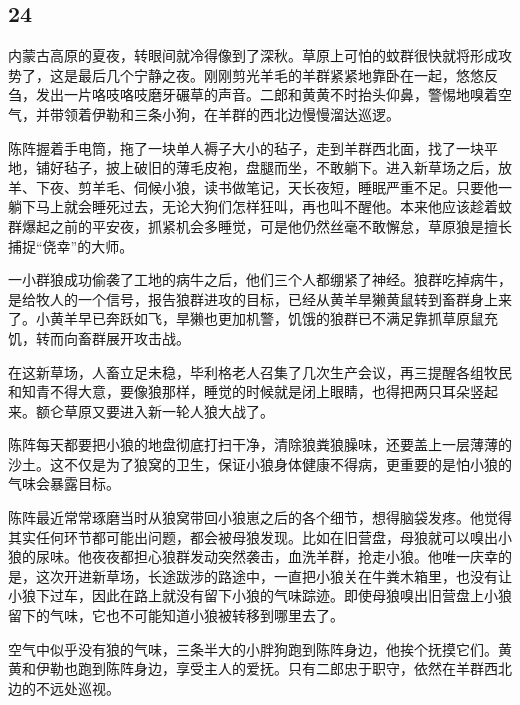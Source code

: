 \subsection*{24}



\par 内蒙古高原的夏夜，转眼间就冷得像到了深秋。草原上可怕的蚊群很快就将形成攻势了，这是最后几个宁静之夜。刚刚剪光羊毛的羊群紧紧地靠卧在一起，悠悠反刍，发出一片咯吱咯吱磨牙碾草的声音。二郎和黄黄不时抬头仰鼻，警惕地嗅着空气，并带领着伊勒和三条小狗，在羊群的西北边慢慢溜达巡逻。
\par 陈阵握着手电筒，拖了一块单人褥子大小的毡子，走到羊群西北面，找了一块平地，铺好毡子，披上破旧的薄毛皮袍，盘腿而坐，不敢躺下。进入新草场之后，放羊、下夜、剪羊毛、伺候小狼，读书做笔记，天长夜短，睡眠严重不足。只要他一躺下马上就会睡死过去，无论大狗们怎样狂叫，再也叫不醒他。本来他应该趁着蚊群爆起之前的平安夜，抓紧机会多睡觉，可是他仍然丝毫不敢懈怠，草原狼是擅长捕捉“侥幸”的大师。
\par 一小群狼成功偷袭了工地的病牛之后，他们三个人都绷紧了神经。狼群吃掉病牛，是给牧人的一个信号，报告狼群进攻的目标，已经从黄羊旱獭黄鼠转到畜群身上来了。小黄羊早已奔跃如飞，旱獭也更加机警，饥饿的狼群已不满足靠抓草原鼠充饥，转而向畜群展开攻击战。
\par 在这新草场，人畜立足未稳，毕利格老人召集了几次生产会议，再三提醒各组牧民和知青不得大意，要像狼那样，睡觉的时候就是闭上眼睛，也得把两只耳朵竖起来。额仑草原又要进入新一轮人狼大战了。
\par 陈阵每天都要把小狼的地盘彻底打扫干净，清除狼粪狼臊味，还要盖上一层薄薄的沙土。这不仅是为了狼窝的卫生，保证小狼身体健康不得病，更重要的是怕小狼的气味会暴露目标。
\par 陈阵最近常常琢磨当时从狼窝带回小狼崽之后的各个细节，想得脑袋发疼。他觉得其实任何环节都可能出问题，都会被母狼发现。比如在旧营盘，母狼就可以嗅出小狼的尿味。他夜夜都担心狼群发动突然袭击，血洗羊群，抢走小狼。他唯一庆幸的是，这次开进新草场，长途跋涉的路途中，一直把小狼关在牛粪木箱里，也没有让小狼下过车，因此在路上就没有留下小狼的气味踪迹。即使母狼嗅出旧营盘上小狼留下的气味，它也不可能知道小狼被转移到哪里去了。
\par 空气中似乎没有狼的气味，三条半大的小胖狗跑到陈阵身边，他挨个抚摸它们。黄黄和伊勒也跑到陈阵身边，享受主人的爱抚。只有二郎忠于职守，依然在羊群西北边的不远处巡视。
